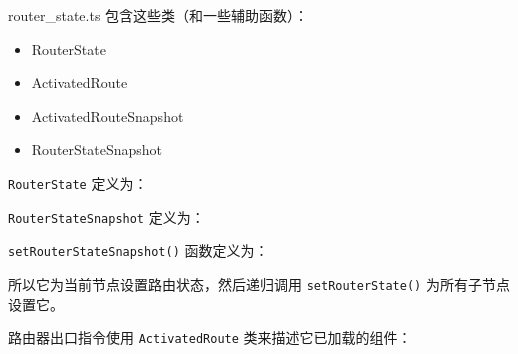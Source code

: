 


router\_state.ts 包含这些类（和一些辅助函数）：

\begin{itemize}
  \item RouterState
  \item ActivatedRoute
  \item ActivatedRouteSnapshot
  \item RouterStateSnapshot
\end{itemize}


\texttt{RouterState} 定义为：




\texttt{RouterStateSnapshot} 定义为：




\texttt{setRouterStateSnapshot()} 函数定义为：




所以它为当前节点设置路由状态，然后递归调用 \texttt{setRouterState()} 为所有子节点设置它。


路由器出口指令使用 \texttt{ActivatedRoute} 类来描述它已加载的组件：


